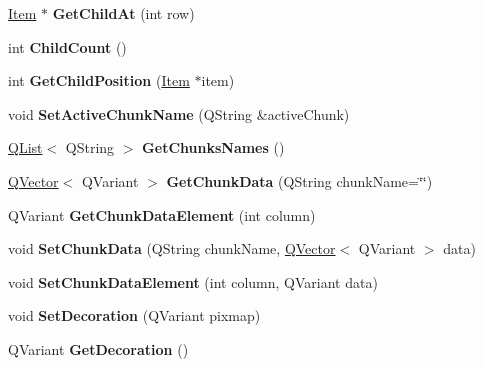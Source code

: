 \begin{DoxyCompactItemize}
\hyperlink{class_item}{Item} $\ast$ {\bfseries Get\+Child\+At} (int row)
\item 
\mbox{\label{class_item_a9324d6e789340e65394bea357954e6e1}} 
int {\bfseries Child\+Count} ()
\item 
\mbox{\label{class_item_afccf539d108a9b083b67105ccb548f11}} 
int {\bfseries Get\+Child\+Position} (\hyperlink{class_item}{Item} $\ast$item)
\item 
\mbox{\label{class_item_accef83c1103296fc80b30a809e7ae293}} 
void {\bfseries Set\+Active\+Chunk\+Name} (Q\+String \&active\+Chunk)
\item 
\mbox{\label{class_item_ab50d988f2abaaa6a0803b1d35d239220}} 
\hyperlink{class_q_list}{Q\+List}$<$ Q\+String $>$ {\bfseries Get\+Chunks\+Names} ()
\item 
\mbox{\label{class_item_af0ee587a5f74c92bd4d9a902a6a7e0d3}} 
\hyperlink{class_q_vector}{Q\+Vector}$<$ Q\+Variant $>$ {\bfseries Get\+Chunk\+Data} (Q\+String chunk\+Name=\char`\"{}\char`\"{})
\item 
\mbox{\label{class_item_a6f25765ce2c56248e04d04ebec90d34d}} 
Q\+Variant {\bfseries Get\+Chunk\+Data\+Element} (int column)
\item 
\mbox{\label{class_item_a0617312073b3d751518cfd6269c25c0a}} 
void {\bfseries Set\+Chunk\+Data} (Q\+String chunk\+Name, \hyperlink{class_q_vector}{Q\+Vector}$<$ Q\+Variant $>$ data)
\item 
\mbox{\label{class_item_a2206a4c379b351c9cbbe2406399d2b30}} 
void {\bfseries Set\+Chunk\+Data\+Element} (int column, Q\+Variant data)
\item 
\mbox{\label{class_item_ab0fa052dc1e0dc785767d25a6010ea13}} 
void {\bfseries Set\+Decoration} (Q\+Variant pixmap)
\item 
\mbox{\label{class_item_ad74957af2eb1996ebdcece4ccdb11c4d}} 
Q\+Variant {\bfseries Get\+Decoration} ()
\item 
\mbox{\label{class_item_a3466b4b51b244ccbcac853ee7240af47}} 

\end{DoxyCompactItemize}
